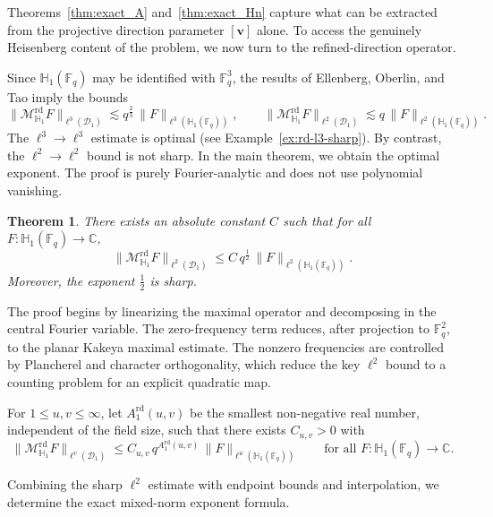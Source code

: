 \documentclass[11pt]{article}
\newtheorem{theorem}{Theorem}[section]
\newcommand{\1}{\mathbf 1}
\begin{document}
Theorems~\ref{thm:exact_A} and~\ref{thm:exact_Hn} capture what can be extracted from the projective direction parameter $[\mathbf{v}]$ alone. To access the genuinely Heisenberg content of the problem, we now turn to the refined-direction operator.


Since \(\mathbb H_1(\mathbb F_q)\) may be identified with \(\mathbb F_q^3\), the results of Ellenberg, Oberlin, and Tao
\cite[Theorem~1.3 and Remark~1.4]{EOT} imply the bounds
\[
\|\mathcal{M}^{\mathrm{rd}}_{\mathbb H_1}F\|_{\ell^3(\mathcal D_1)}
\lesssim q^{\frac{2}{3}}\,\|F\|_{\ell^3(\mathbb H_1(\mathbb F_q))},
\qquad
\|\mathcal{M}^{\mathrm{rd}}_{\mathbb H_1}F\|_{\ell^2(\mathcal D_1)}
\lesssim q\,\|F\|_{\ell^2(\mathbb H_1(\mathbb F_q))}.
\]
The \(\ell^3\to\ell^3\) estimate is optimal (see Example~\ref{ex:rd-l3-sharp}). By contrast, the \(\ell^2\to\ell^2\) bound is not sharp. In the main theorem, we obtain the optimal exponent. The proof is purely Fourier-analytic and does not use polynomial vanishing.


\begin{theorem}\label{thm:sr-l2-bound}
There exists an absolute constant \(C\) such that for 
all \(F:\mathbb H_1(\mathbb F_q)\to\mathbb C\),
\[
\|\mathcal{M}^{\mathrm{rd}}_{\mathbb H_1}F\|_{\ell^2(\mathcal D_1)}
\le
C\,q^{\frac{1}{2}}\,\|F\|_{\ell^2(\mathbb H_1(\mathbb F_q))}.
\]
Moreover, the exponent \(\frac{1}{2}\) is sharp.
\end{theorem}

The proof begins by linearizing the maximal operator and decomposing in the central Fourier variable.
The zero-frequency term reduces, after projection to $\mathbb{F}_q^2$, to the planar Kakeya maximal estimate.
The nonzero frequencies are controlled by Plancherel and character orthogonality, which reduce the key $\ell^2$ bound
to a counting problem for an explicit quadratic map.

For $1\le u,v\le \infty$, let $A^{\mathrm{rd}}_1(u,v)$ be the smallest non-negative real number, independent of the field size, such that there exists
$C_{u,v}>0$ with
\begin{equation}\label{eq:Ard-def-proof}
\|\mathcal{M}^{\mathrm{rd}}_{\mathbb H_1}F\|_{\ell^v(\mathcal D_1)}
\le
C_{u,v}\,q^{A^{\mathrm{rd}}_1(u,v)}\,
\|F\|_{\ell^u(\mathbb H_1(\mathbb F_q))}
\qquad\text{for all }F:\mathbb H_1(\mathbb F_q)\to\mathbb C.
\end{equation}

Combining the sharp $\ell^2$ estimate with endpoint bounds and interpolation, we determine the exact mixed-norm exponent formula.
\end{document}
